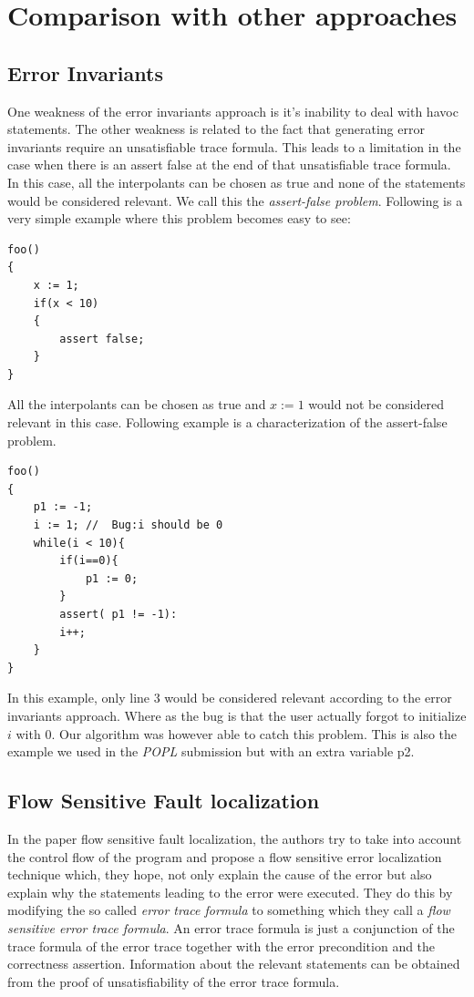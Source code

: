 \documentclass{article}
\begin{document}
\section{Comparison with other approaches}
\subsection{Error Invariants}
One weakness of the error invariants approach \cite{errorinvariants} is it's inability to deal with havoc statements. The other weakness is related to the fact that generating error invariants require an unsatisfiable trace formula. This leads to a limitation in the case when there is an assert false at the end of that unsatisfiable trace formula. In this case, all the interpolants can be chosen as true and none of the statements would be considered relevant. We call this the \textit{assert-false problem}. Following is a very simple example where this problem becomes easy to see:
\begin{lstlisting}
foo()
{ 
	x := 1;
	if(x < 10)
	{
		assert false;	
	}	
}
\end{lstlisting}
All the interpolants can be chosen as true and $x:=1$ would not be considered relevant in this case. Following example is a characterization of the assert-false problem.
\begin{lstlisting}
foo()
{ 
	p1 := -1;
	i := 1; //  Bug:i should be 0
	while(i < 10){
		if(i==0){
			p1 := 0;		
		}
		assert( p1 != -1):
		i++;	
	}
}
\end{lstlisting}
In this example, only line 3 would be considered relevant according to the error invariants approach. Where as the bug is that the user actually forgot to initialize $i$ with 0. Our algorithm was however able to catch this problem. This is also the example we used in the \textit{POPL} submission but with an extra variable p2.

\subsection{Flow Sensitive Fault localization} 
In the paper flow sensitive fault localization\cite{faultlocalization}, the authors try to take into account the control flow of the program and propose a flow sensitive error localization technique which, they hope, not only explain the cause of the error but also explain why the statements leading to the error were executed. They do this by modifying the so called \textit{error trace formula} to something which they call a \textit{flow sensitive error trace formula}. An error trace formula is just a conjunction of the trace formula of the error trace together with the error precondition and the correctness assertion. Information about the relevant statements can be obtained from the proof of unsatisfiability of the error trace formula.
\end{document}
